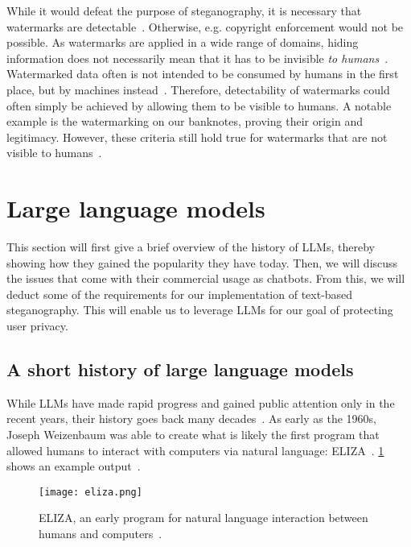 While it would defeat the purpose of steganography, it is necessary that watermarks are detectable~\cite{evsutinDigitalSteganographyWatermarking2020,soltanipanahPropertiesNonMediaDigital2016}. Otherwise, e.g. copyright enforcement would not be possible. As watermarks are applied in a wide range of domains, hiding information does not necessarily mean that it has to be invisible \textit{to humans}~\cite{soltanipanahPropertiesNonMediaDigital2016}. Watermarked data often is not intended to be consumed by humans in the first place, but by machines instead~\cite{soltanipanahPropertiesNonMediaDigital2016}. Therefore, detectability of watermarks could often simply be achieved by allowing them to be visible to humans. A notable example is the watermarking on our banknotes, proving their origin and legitimacy. However, these criteria still hold true for watermarks that are not visible to humans~\cite{evsutinDigitalSteganographyWatermarking2020,soltanipanahPropertiesNonMediaDigital2016}.

\section{Large language models}
\label{sec:LLMs}
This section will first give a brief overview of the history of \glspl{LLM}, thereby showing how they gained the popularity they have today. Then, we will discuss the issues that come with their commercial usage as chatbots. From this, we will deduct some of the requirements for our implementation of text-based steganography. This will enable us to leverage \glspl{LLM} for our goal of protecting user privacy.

\subsection{A short history of large language models}
\label{sec:aShortHistoryOfLLMs}
While \glspl{LLM} have made rapid progress and gained public attention only in the recent years, their history goes back many decades~\cite{berryLimitsComputationJoseph2023}. As early as the 1960s, Joseph Weizenbaum was able to create what is likely the first program that allowed humans to interact with computers via natural language: ELIZA~\cite{weizenbaumELIZAComputerProgram1966}. \cref{fig:eliza} shows an example output~\cite{wangELIZAChatGPTBrief2024}.

\begin{figure}
    \begin{wide}
        \centering
        \captionsetup{width=\linewidth}
        \texttt{[image: eliza.png]}
        \caption[ELIZA]{ELIZA, an early program for natural language interaction between humans and computers~\cite{wangELIZAChatGPTBrief2024}.}
        \label{fig:eliza}
    \end{wide}
\end{figure}


